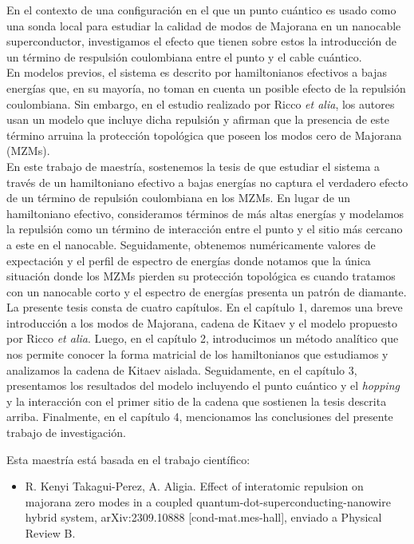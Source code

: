 \begin{resumen}%
En el contexto de una configuraci\'{o}n en el que un punto cu\'{a}ntico es usado como una sonda local para estudiar la calidad de modos de Majorana en un nanocable superconductor, investigamos el efecto que tienen sobre estos la introducci\'{o}n de un t\'{e}rmino de respulsi\'{o}n coulombiana entre el punto y el cable cu\'{a}ntico.\\
En modelos previos, el sistema es descrito por hamiltonianos efectivos a bajas energ\'{i}as que, en su mayor\'{i}a, no toman en cuenta un posible efecto de la repulsi\'{o}n coulombiana. Sin embargo, en el estudio realizado por Ricco \emph{et alia}, los autores usan un modelo que incluye dicha repulsi\'{o}n y afirman que la presencia de este t\'{e}rmino arruina la protecci\'{o}n topol\'{o}gica que poseen los modos cero de Majorana (MZMs).\\
En este trabajo de maestr\'{i}a, sostenemos la tesis de que estudiar el sistema a trav\'{e}s de un hamiltoniano efectivo a bajas energ\'{i}as no captura el verdadero efecto de un t\'{e}rmino de repulsi\'{o}n coulombiana en los MZMs. En lugar de un hamiltoniano efectivo, consideramos t\'{e}rminos de m\'{a}s altas energ\'{i}as y modelamos la repulsi\'{o}n como un t\'{e}rmino de interacci\'{o}n entre el punto y el sitio m\'{a}s cercano a este en el nanocable. Seguidamente, obtenemos num\'{e}ricamente valores de expectaci\'{o}n y el perfil de espectro de energ\'{i}as donde notamos que la \'{u}nica situaci\'{o}n donde los MZMs pierden su protecci\'{o}n topol\'{o}gica es cuando tratamos con un nanocable corto y el espectro de energ\'{i}as presenta un patr\'{o}n de diamante.\\
La presente tesis consta de cuatro cap\'{i}tulos. En el cap\'{i}tulo 1, daremos una breve introducci\'{o}n a los modos de Majorana, cadena de Kitaev y el modelo propuesto por Ricco \emph{et alia}. Luego, en el cap\'{i}tulo 2, introducimos un m\'{e}todo anal\'{i}tico que nos permite conocer la forma matricial de los hamiltonianos que estudiamos y analizamos la cadena de Kitaev aislada. Seguidamente, en el cap\'{i}tulo 3, presentamos los resultados del modelo incluyendo el punto cu\'{a}ntico y el \emph{hopping} y la interacci\'{o}n con el primer sitio de la cadena que sostienen la tesis descrita arriba. Finalmente, en el cap\'{i}tulo 4, mencionamos las conclusiones del presente trabajo de investigaci\'{o}n. 
\begin{center}
    Esta maestr\'{i}a est\'{a} basada en el trabajo cient\'{i}fico: 
    \begin{itemize}
        \item \cite{perez2023effect} R. Kenyi Takagui-Perez, A. Aligia. Effect of interatomic repulsion on majorana zero modes in a coupled quantum-dot-superconducting-nanowire hybrid system, arXiv:2309.10888 [cond-mat.mes-hall], enviado a Physical Review B.
    \end{itemize}
\end{center}
\end{resumen}




